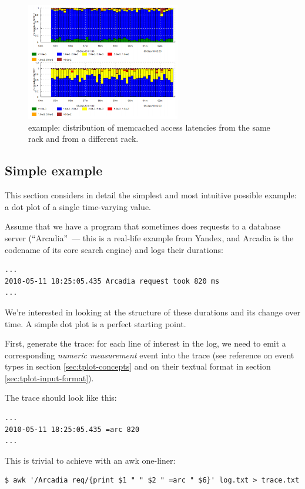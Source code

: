 \documentclass{article}
\begin{document}
\begin{figure}[h]
\center
\includegraphics[width=0.6\textwidth]{pics/tplot/tplot-motivating-example.png}
\caption{\timeplot{} example: distribution of memcached access latencies from the same rack and from a different rack.}
\label{fig:tplot-example}
\end{figure}

\pagebreak
\subsection{Simple example}
\label{sec:tplot-simple-example}
This section considers in detail the simplest and most intuitive possible example: a dot plot of a single time-varying value.

Assume that we have a program that sometimes does requests to a database server (``Arcadia''~--- this is a real-life example from Yandex, and Arcadia is the codename of its core search engine) and logs their durations:

\begin{verbatim}
...
2010-05-11 18:25:05.435 Arcadia request took 820 ms
...
\end{verbatim}

We're interested in looking at the structure of these durations and its change over time. A simple dot plot is a perfect starting point.

First, generate the trace: for each line of interest in the log, we need to emit a corresponding \emph{numeric measurement} event into the trace (see reference on event types in section \ref{sec:tplot-concepts} and on their textual format in section \ref{sec:tplot-input-format}).

The trace should look like this:
\begin{verbatim}
...
2010-05-11 18:25:05.435 =arc 820
...
\end{verbatim}

This is trivial to achieve with an awk one-liner:
\begin{verbatim}
$ awk '/Arcadia req/{print $1 " " $2 " =arc " $6}' log.txt > trace.txt
\end{verbatim}
\end{document}
